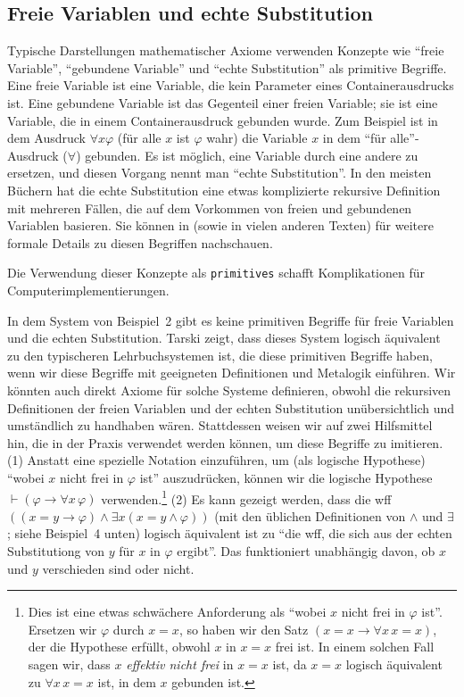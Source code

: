 \subsection{Freie Variablen und echte Substitution}

Typische Darstellungen mathematischer Axiome verwenden Konzepte wie "`freie Variable"', "`gebundene Variable"' und "`echte Substitution"' als primitive Begriffe. Eine freie Variable ist eine Variable, die kein Parameter eines Containerausdrucks ist. Eine gebundene Variable ist das Gegenteil einer freien Variable; sie ist eine Variable, die in einem Containerausdruck gebunden wurde. Zum Beispiel ist in dem Ausdruck $\forall x \varphi$ (für alle $x$ ist $\varphi$ wahr) die Variable $x$ in dem "`für alle"'-Ausdruck ($\forall$) gebunden. Es ist möglich, eine Variable durch eine andere zu ersetzen, und diesen Vorgang nennt man "`echte Substitution"'. In den meisten Büchern hat die echte Substitution eine etwas komplizierte rekursive Definition mit mehreren Fällen, die auf dem Vorkommen von freien und gebundenen Variablen basieren.
Sie können in \cite[ch.\ 3--4]{Hamilton} (sowie in vielen anderen Texten) für weitere formale Details zu diesen Begriffen nachschauen.

Die Verwendung dieser Konzepte als \texttt{primitives} schafft Komplikationen für Computerimplementierungen.

In dem System von Beispiel~2 gibt es keine primitiven Begriffe für freie Variablen und die echten Substitution.  Tarski \cite{Tarski1965} zeigt, dass dieses System logisch äquivalent zu den typischeren Lehrbuchsystemen ist, die diese primitiven Begriffe haben, wenn wir diese Begriffe mit geeigneten Definitionen und Metalogik einführen.  Wir könnten auch direkt Axiome für solche Systeme definieren, obwohl die rekursiven Definitionen der freien Variablen und der echten Substitution unübersichtlich und umständlich zu handhaben wären.  Stattdessen weisen wir auf zwei Hilfsmittel hin, die in der Praxis verwendet werden können, um diese Begriffe zu imitieren.  (1) Anstatt eine spezielle Notation einzuführen, um (als logische Hypothese) "`wobei $x$ nicht frei in $\varphi$ ist"' auszudrücken, können wir die logische Hypothese $\vdash(\varphi\to\forall x\,\varphi)$ verwenden.\label{effectivelybound}\footnote{Dies ist eine etwas schwächere Anforderung als "`wobei $x$ nicht frei in $\varphi$ ist"'.  Ersetzen wir $\varphi$ durch $x=x$, so haben wir den Satz $(x=x\to\forall x\,x=x)$, der die Hypothese erfüllt, obwohl $x$ in $x=x$ frei ist. In einem solchen Fall sagen wir, dass $x$ {\em effektiv nicht frei} in $x=x$ ist, da $x=x$ logisch äquivalent zu $\forall x\,x=x$ ist, in dem $x$ gebunden ist.} (2) Es kann gezeigt werden, dass die wff $((x=y\to\varphi)\wedge\exists x(x=y\wedge\varphi))$ (mit den üblichen Definitionen von $\wedge$ und $\exists$; siehe Beispiel~4 unten) logisch äquivalent ist zu "`die wff, die sich aus der echten Substitutiong von $y$ für $x$ in $\varphi$ ergibt"'.  Das funktioniert unabhängig davon, ob $x$ und $y$ verschieden sind oder nicht.

